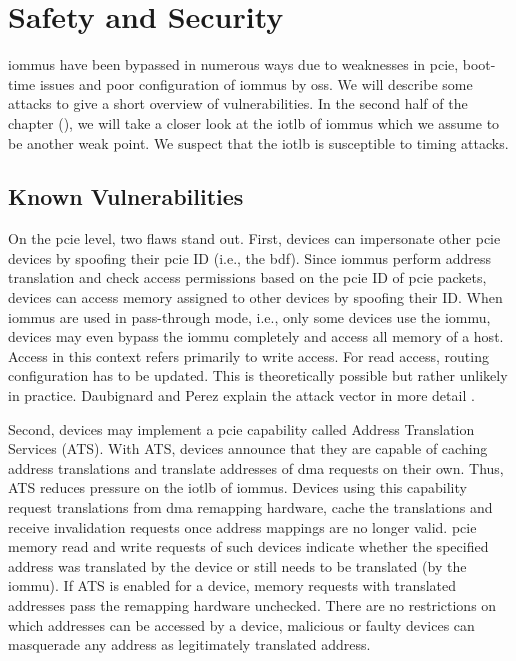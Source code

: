 \chapter{Safety and Security}
\label{chap:safety_and_security}

\acp{iommu} have been bypassed in numerous ways due to weaknesses in \ac{pcie},
boot-time issues and poor configuration of \acp{iommu} by \acp{os}. We will
describe some attacks to give a short overview of vulnerabilities. In the second
half of the chapter (), we will take a closer look at the
\ac{iotlb} of \acp{iommu} which we assume to be another weak point. We suspect
that the \ac{iotlb} is susceptible to timing attacks.


\section{Known Vulnerabilities}
\label{sec:known_vulnerabilities}

On the \ac{pcie} level, two flaws stand out. First, devices can impersonate
other \ac{pcie} devices by spoofing their \ac{pcie} ID (i.e., the \ac{bdf}).
Since \acp{iommu} perform address translation and check access permissions based
on the \ac{pcie} ID of \ac{pcie} packets, devices can access memory assigned to
other devices by spoofing their ID. When \acp{iommu} are used in pass-through
mode, i.e., only some devices use the \ac{iommu}, devices may even bypass the
\ac{iommu} completely and access all memory of a host. Access in this context
refers primarily to write access. For read access, routing configuration has to
be updated. This is theoretically possible but rather unlikely in practice.
Daubignard and Perez explain the attack vector in more detail
\cite{daubignard2017protip}.

Second, devices may implement a \ac{pcie} capability called Address Translation
Services (ATS). With ATS, devices announce that they are capable of caching
address translations and translate addresses of \ac{dma} requests on their own.
Thus, ATS reduces pressure on the \ac{iotlb} of \acp{iommu}. Devices using this
capability request translations from \ac{dma} remapping hardware, cache the
translations and receive invalidation requests once address mappings are no
longer valid. \ac{pcie} memory read and write requests of such devices indicate
whether the specified address was translated by the device or still needs to be
translated (by the \ac{iommu}). If ATS is enabled for a device, memory requests
with translated addresses pass the remapping hardware unchecked. There are no
restrictions on which addresses can be accessed by a device, malicious or faulty
devices can masquerade any address as legitimately translated address.

